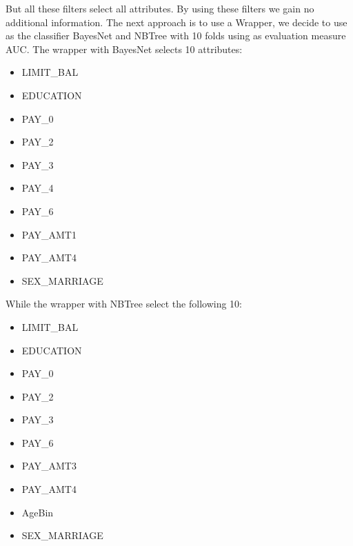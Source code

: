 \documentclass[fleqn,10pt]{SelfArx} %
\begin{document}
But all these filters select all attributes. By using these filters we gain no additional information.
The next approach is to use a Wrapper, we decide to use as the classifier BayesNet and NBTree with 10 folds using as evaluation measure AUC.
The wrapper with BayesNet selects 10 attributes:
\begin{itemize}[noitemsep]
\item LIMIT\_BAL
\item EDUCATION
\item PAY\_0
\item PAY\_2
\item PAY\_3
\item PAY\_4
\item PAY\_6
\item PAY\_AMT1
\item PAY\_AMT4
\item SEX\_MARRIAGE
\end{itemize}
While the wrapper with NBTree select the following 10:
\begin{itemize}[noitemsep]
	\item LIMIT\_BAL
	\item EDUCATION
	\item PAY\_0
	\item PAY\_2
	\item PAY\_3
	\item PAY\_6
	\item PAY\_AMT3
	\item PAY\_AMT4
	\item AgeBin
	\item SEX\_MARRIAGE
\end{itemize}

	\nocite{DataSet}
	\nocite{LucaNoteBook}
	\nocite{Default}
	\nocite{ItalPress}
	
	
	
	
\end{document}
